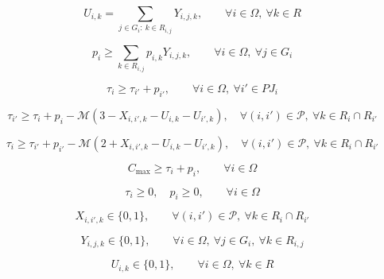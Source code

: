 \documentclass{article}
\begin{document}
\begin{equation}
U_{i,k} =
\sum_{j \in G_i:\ k \in R_{i,j}} Y_{i,j,k},
\qquad
\forall i \in \Omega,\ \forall k \in R
\tag{4}
\end{equation}

\begin{equation}
p_i \ge \sum_{k \in R_{i,j}} p_{i,k} Y_{i,j,k},
\qquad
\forall i \in \Omega,\ \forall j \in G_i
\tag{5}
\end{equation}

\begin{equation}
\tau_i \ge \tau_{i'} + p_{i'},
\qquad
\forall i \in \Omega,\ \forall i' \in PJ_i
\tag{6}
\end{equation}

\begin{equation}
\tau_{i'} \ge
\tau_i + p_i
- \mathcal{M}\left(3 - X_{i,i',k} - U_{i,k} - U_{i',k}\right),
\quad
\forall (i,i') \in \mathcal{P},\ \forall k \in R_i \cap R_{i'}
\tag{7}
\end{equation}

\begin{equation}
\tau_i \ge
\tau_{i'} + p_{i'}
- \mathcal{M}\left(2 + X_{i,i',k} - U_{i,k} - U_{i',k}\right),
\quad
\forall (i,i') \in \mathcal{P},\ \forall k \in R_i \cap R_{i'}
\tag{8}
\end{equation}

\begin{equation}
C_{\max} \ge \tau_i + p_i,
\qquad \forall i \in \Omega
\tag{9}
\end{equation}

\begin{equation}
\tau_i \ge 0,\quad p_i \ge 0,
\qquad \forall i \in \Omega
\tag{10}
\end{equation}

\begin{equation}
X_{i,i',k} \in \{0,1\},
\qquad \forall (i,i') \in \mathcal{P},\ \forall k \in R_i \cap R_{i'}
\tag{11}
\end{equation}

\begin{equation}
Y_{i,j,k} \in \{0,1\},
\qquad \forall i \in \Omega,\ \forall j \in G_i,\ \forall k \in R_{i,j}
\tag{12}
\end{equation}

\begin{equation}
U_{i,k} \in \{0,1\},
\qquad \forall i \in \Omega,\ \forall k \in R
\tag{13}
\end{equation}
\end{document}
